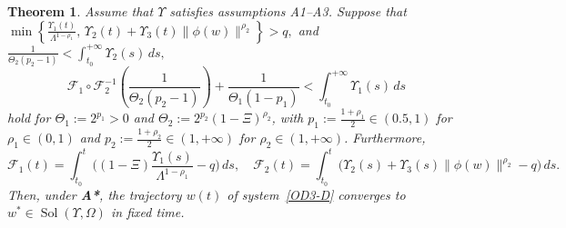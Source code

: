 \documentclass{article}
\theoremstyle{plain}%
\newtheorem{theorem}{Theorem}[section]
\theoremstyle{thmstyletwo}%
\theoremstyle{thmstylethree}%
\begin{document}
\begin{theorem}\label{thmFT-robust}
Assume that $\Upsilon$ satisfies assumptions A1--A3.
Suppose that
\(
\min\!\left\{
\frac{\Upsilon_1(t)}{\Lambda^{1-\rho_1}},
\,
\Upsilon_2(t) + \Upsilon_3(t) \|\phi(w)\|^{\rho_2}
\right\}>q,
\)
and
\(\frac{1}{\Theta_2(p_2-1)}
<
\int_{t_0}^{+\infty}
\Upsilon_2(s)\,ds,\)
\[
\mathcal F_1\!\circ\!\mathcal F_2^{-1}
\!\left(\frac{1}{\Theta_2(p_2-1)}\right)
+\frac{1}{\Theta_1(1-p_1)}
<
\int_{t_0}^{+\infty}
\Upsilon_1(s)\,ds
\]
hold for $\Theta_1 := 2^{p_1}>0$ and $\Theta_2 := 2^{p_2}(1-\Xi)^{\rho_2}$, with 
$p_1 := \frac{1+\rho_1}{2}\in(0.5,1)$ for $\rho_1\in(0,1)$ and 
$p_2 := \frac{1+\rho_2}{2}\in(1,+\infty)$ for $\rho_2\in(1,+\infty)$.
Furthermore,
\[
\mathcal{F}_1(t)=\int_{t_0}^t\Big((1-\Xi)\frac{\Upsilon_1(s)}{\Lambda^{1-\rho_1}}-q\Big)\,ds,\quad
\mathcal{F}_2(t)=\int_{t_0}^t\Big(\Upsilon_2(s)+\Upsilon_3(s)\|\phi(w)\|^{\rho_2}-q\Big)\,ds.
\]
Then, under \textbf{A*}, the trajectory $w(t)$ of system~\eqref{OD3-D}
converges to $w^*\in\operatorname{Sol}(\Upsilon,\Omega)$ in fixed time.
\end{theorem}
\end{document}

